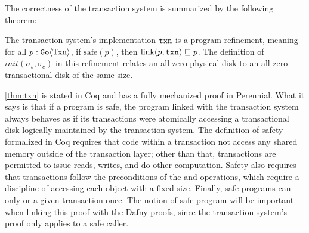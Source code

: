 %


The correctness of the transaction system is summarized by the following theorem:

\begin{theorem}
  The transaction system's implementation $\texttt{txn}$ is a program refinement, meaning for
  all $p : \mathtt{Go}\langle \mathrm{Txn} \rangle$, if $\mathrm{safe}(p)$, then
  $\mathrm{link}(p, \texttt{txn}) \sqsubseteq p$. The definition of
  $init(\sigma_{s}, \sigma_{c})$ in this refinement relates an all-zero physical
  disk to an all-zero transactional disk of the same size.
  \label{thm:txn}
\end{theorem}

\autoref{thm:txn} is stated in Coq and has a fully mechanized proof in Perennial.
What it says is that if a program is safe, the program linked with the
transaction system always behaves as if its transactions were atomically
accessing a transactional disk logically maintained by the transaction system.
The definition of safety formalized in Coq requires that code within a
transaction not access any shared memory outside of the transaction layer; other
than that, transactions are permitted to issue reads, writes, and do other
computation. Safety also requires that transactions follow the preconditions of
the  and  operations, which require a discipline of accessing
each object with a fixed size. Finally, safe programs can only  or
 a given transaction once. The notion of safe program will be
important when linking this proof with the Dafny proofs, since the transaction
system's proof only applies to a safe caller.

